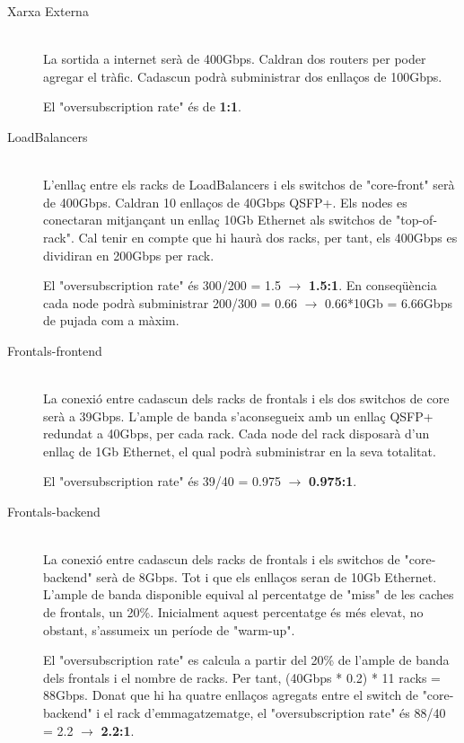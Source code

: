     \begin{description}
    
        \item[Xarxa Externa] \hfill \\
            La sortida a internet serà de 400Gbps. Caldran dos routers per poder agregar el tràfic. Cadascun podrà subministrar dos enllaços de 100Gbps. 
            
            El "oversubscription rate" és de \textbf{1:1}.
        
        \item[LoadBalancers] \hfill \\
            L'enllaç entre els racks de LoadBalancers i els switchos de "core-front" serà de 400Gbps. Caldran 10 enllaços de 40Gbps QSFP+. Els nodes es conectaran mitjançant un enllaç 10Gb Ethernet als switchos de "top-of-rack". Cal tenir en compte que hi haurà dos racks, per tant, els 400Gbps es dividiran en 200Gbps per rack. 

El "oversubscription rate" és 300/200 = 1.5 $\rightarrow$ \textbf{1.5:1}. En conseqüència cada node podrà subministrar 200/300 = 0.66 $\rightarrow$ 0.66*10Gb = 6.66Gbps de pujada com a màxim.
            
        
        \item[Frontals-frontend] \hfill \\
            La conexió entre cadascun dels racks de frontals i els dos switchos de core serà a 39Gbps. L'ample de banda s'aconsegueix amb un enllaç QSFP+ redundat a 40Gbps, per cada rack. Cada node del rack disposarà d'un enllaç de 1Gb Ethernet, el qual podrà subministrar en la seva totalitat. 

El "oversubscription rate" és 39/40 = 0.975 $\rightarrow$ \textbf{0.975:1}. 
        
        \item[Frontals-backend] \hfill \\
           La conexió entre cadascun dels racks de frontals i els switchos de "core-backend" serà de 8Gbps. Tot i que els enllaços seran de 10Gb Ethernet. L'ample de banda disponible equival al percentatge de "miss" de les caches de frontals, un 20\%. Inicialment aquest percentatge és més elevat, no obstant, s'assumeix un període de "warm-up".
           
            El "oversubscription rate" es calcula a partir del 20\% de l'ample de banda dels frontals i el nombre de racks. Per tant, (40Gbps * 0.2) * 11 racks = 88Gbps. Donat que hi ha quatre enllaços agregats entre el switch de "core-backend" i el rack d'emmagatzematge, el "oversubscription rate" és 88/40 = 2.2 $\rightarrow$ \textbf{2.2:1}.
            

\end{description}
